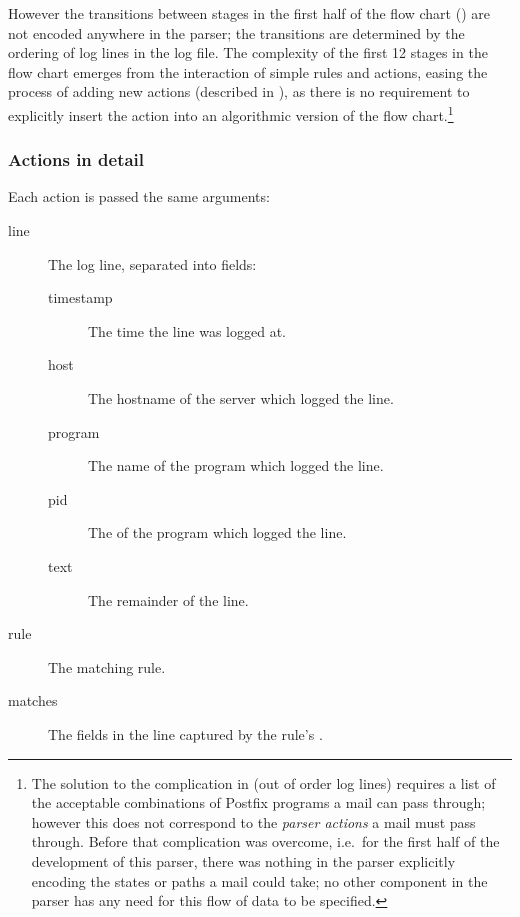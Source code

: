 However the transitions between stages in the first half of the flow chart
() are not encoded anywhere in
the parser; the transitions are determined by the ordering of log lines in
the log file.  The complexity of the first 12 stages in the flow chart
emerges from the interaction of simple rules and actions, easing the
process of adding new actions (described in ), as there is no requirement to explicitly insert the action into
an algorithmic version of the flow chart.\footnote{The solution to the
complication in  (out of order log
lines) requires a list of the acceptable combinations of Postfix programs a
mail can pass through; however this does not correspond to the
\textit{parser actions\/} a mail must pass through.  Before that
complication was overcome, i.e.\ for the first half of the development of
this parser, there was nothing in the parser explicitly encoding the states
or paths a mail could take; no other component in the parser has any need
for this flow of data to be specified.}



\subsubsection{Actions in detail}

\label{actions-in-detail}

Each action is passed the same arguments:

\begin{description}

    \item [line] The log line, separated into fields:

        \begin{description}

            \item [timestamp] The time the line was logged at.

            \item [host] The hostname of the server which logged the line.

            \item [program] The name of the program which logged the line.

            \item [pid] The \pid{} of the program which logged the line.

            \item [text] The remainder of the line.

        \end{description}

    \item [rule] The matching rule.

    \item [matches] The fields in the line captured by the rule's \regex{}.

\end{description}

